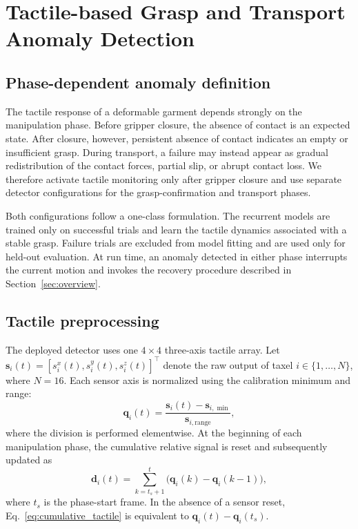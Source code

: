 \section{Tactile-based Grasp and Transport Anomaly Detection}
\label{sec:anomaly}

\subsection{Phase-dependent anomaly definition}
\label{sec:anomaly_definition}

The tactile response of a deformable garment depends strongly on the
manipulation phase. Before gripper closure, the absence of contact is an
expected state. After closure, however, persistent absence of contact indicates
an empty or insufficient grasp. During transport, a failure may instead appear
as gradual redistribution of the contact forces, partial slip, or abrupt
contact loss. We therefore activate tactile monitoring only after gripper
closure and use separate detector configurations for the grasp-confirmation and
transport phases.

Both configurations follow a one-class formulation. The recurrent models are
trained only on successful trials and learn the tactile dynamics associated
with a stable grasp. Failure trials are excluded from model fitting and are
used only for held-out evaluation. At run time, an anomaly detected in either
phase interrupts the current motion and invokes the recovery procedure
described in Section~\ref{sec:overview}.

\subsection{Tactile preprocessing}
\label{sec:tactile_preprocessing}

The deployed detector uses one $4\times4$ three-axis tactile array. Let
$\mathbf{s}_i(t)=[s_i^x(t),s_i^y(t),s_i^z(t)]^\top$ denote the raw output of
taxel $i\in\{1,\ldots,N\}$, where $N=16$. Each sensor axis is normalized using
the calibration minimum and range:
%
\begin{equation}
    \mathbf{q}_i(t)
    =
    \frac{\mathbf{s}_i(t)-\mathbf{s}_{i,\min}}
         {\mathbf{s}_{i,\mathrm{range}}},
    \label{eq:taxel_normalization}
\end{equation}
%
where the division is performed elementwise. At the beginning of each
manipulation phase, the cumulative relative signal is reset and subsequently
updated as
%
\begin{equation}
    \mathbf{d}_i(t)
    =
    \sum_{k=t_s+1}^{t}
    \bigl(\mathbf{q}_i(k)-\mathbf{q}_i(k-1)\bigr),
    \label{eq:cumulative_tactile}
\end{equation}
%
where $t_s$ is the phase-start frame. In the absence of a sensor reset,
Eq.~\eqref{eq:cumulative_tactile} is equivalent to
$\mathbf{q}_i(t)-\mathbf{q}_i(t_s)$.

